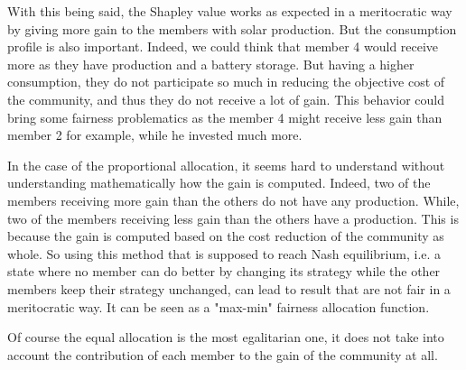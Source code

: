With this being said, the Shapley value works as expected in a meritocratic way by giving more gain to the members with solar production. But the consumption profile is also important. Indeed, we could think that member 4 would receive more as they have production and a battery storage. But having a higher consumption, they do not participate so much in reducing the objective cost of the community, and thus they do not receive a lot of gain. This behavior could bring some fairness problematics as the member 4 might receive less gain than member 2 for example, while he invested much more.

In the case of the proportional allocation, it seems hard to understand without understanding mathematically how the gain is computed. Indeed, two of the members receiving more gain than the others do not have any production. While, two of the members receiving less gain than the others have a production. This is because the gain is computed based on the cost reduction of the community as whole. So using this method that is supposed to reach Nash equilibrium, i.e. a state where no member can do better by changing its strategy while the other members keep their strategy unchanged, can lead to result that are not fair in a meritocratic way. It can be seen as a "max-min" fairness allocation function.

Of course the equal allocation is the most egalitarian one, it does not take into account the contribution of each member to the gain of the community at all. 

